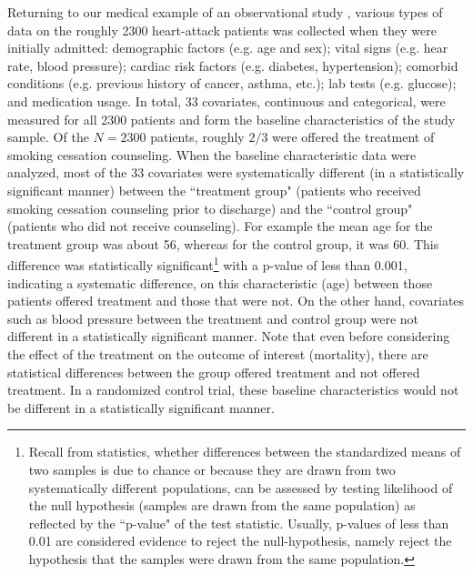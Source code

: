 \documentclass[11pt]{scrartcl}
\begin{document}
Returning to our medical example of an observational study \cite{austin2011tutorial}, various types of data on the roughly 2300 heart-attack patients was collected when they were initially admitted: demographic factors (e.g. age and sex); vital signs (e.g. hear rate, blood pressure); cardiac risk factors (e.g. diabetes, hypertension); comorbid conditions (e.g. previous history of cancer, asthma, etc.); lab tests (e.g. glucose); and medication usage.  In total, 33 covariates, continuous and categorical, were measured for all 2300 patients and form the baseline characteristics of the study sample.  Of the $N=2300$ patients, roughly $2/3$ were offered the treatment of smoking cessation counseling.  When the baseline characteristic data were analyzed, most of the 33 covariates were systematically different (in a statistically significant manner) between the ``treatment group" (patients who received smoking cessation counseling prior to discharge) and the ``control group" (patients who did not receive counseling).  For example the mean age for the treatment group was about 56, whereas for the control group, it was 60.  This difference was statistically significant\footnote{Recall from statistics, whether differences between the standardized means of two samples is due to chance or because they are drawn from two systematically different populations, can be assessed by testing likelihood of the null hypothesis (samples are drawn from the same population) as reflected by the ``p-value" of the test statistic.  Usually, p-values of less than 0.01 are considered evidence to reject the null-hypothesis, namely reject the hypothesis that the samples were drawn from the same population.} with a p-value of less than 0.001, indicating a systematic difference, on this characteristic (age) between those patients offered treatment and those that were not.  On the other hand, covariates such as blood pressure between the treatment and control group were not different in a statistically significant manner.  Note that even before considering the effect of the treatment on the outcome of interest (mortality), there are statistical differences between the group offered treatment and not offered treatment. In a randomized control trial, these baseline characteristics would not be different in a statistically significant manner.  
\end{document}

